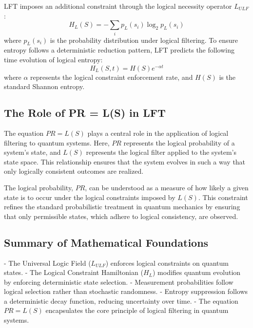 LFT imposes an additional constraint through the logical necessity operator \( L_{ULF} \):
\[
H_L(S) = - \sum_i p_L(s_i) \log_2 p_L(s_i)
\]
where \( p_L(s_i) \) is the probability distribution under logical filtering. To ensure entropy follows a deterministic reduction pattern, LFT predicts the following time evolution of logical entropy:
\[
H_L(S,t) = H(S) e^{-\alpha t}
\]
where \( \alpha \) represents the logical constraint enforcement rate, and \( H(S) \) is the standard Shannon entropy.

\subsection{The Role of PR = L(S) in LFT}
The equation \( PR = L(S) \) plays a central role in the application of logical filtering to quantum systems. Here, $PR$ represents the logical probability of a system's state, and $L(S)$ represents the logical filter applied to the system's state space. This relationship ensures that the system evolves in such a way that only logically consistent outcomes are realized.

The logical probability, \( PR \), can be understood as a measure of how likely a given state is to occur under the logical constraints imposed by $L(S)$. This constraint refines the standard probabilistic treatment in quantum mechanics by ensuring that only permissible states, which adhere to logical consistency, are observed.

\subsection{Summary of Mathematical Foundations}
- The Universal Logic Field ($L_{ULF}$) enforces logical constraints on quantum states.
- The Logical Constraint Hamiltonian ($H_L$) modifies quantum evolution by enforcing deterministic state selection.
- Measurement probabilities follow logical selection rather than stochastic randomness.
- Entropy suppression follows a deterministic decay function, reducing uncertainty over time.
- The equation \( PR = L(S) \) encapsulates the core principle of logical filtering in quantum systems.